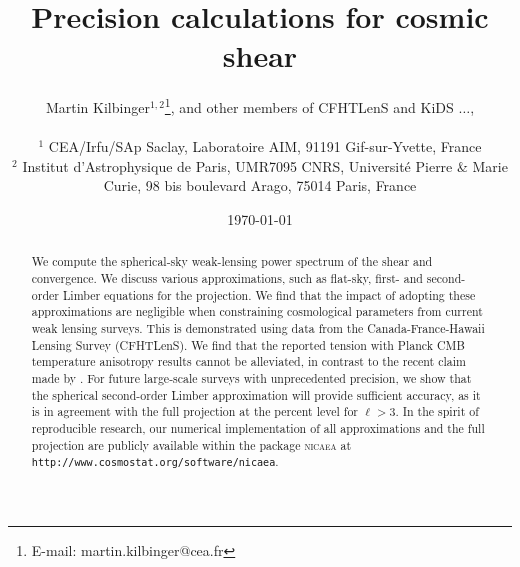 \documentclass[fleqn,usenatbib]{mnras} %
\begin{document}

\title[Precision calculations for cosmic shear]{Precision calculations for cosmic shear}  %

\author[M.~Kilbinger et~al.]
 {
  \parbox[h]{\textwidth}
  {
      Martin Kilbinger$^{1,2}$\thanks{E-mail: martin.kilbinger@cea.fr},
      and other members of CFHTLenS and KiDS
      $\ldots$,
  }
  \vspace*{10pt} \\
  \hspace{-.1cm}$^1$ CEA/Irfu/SAp Saclay, Laboratoire AIM, 91191 Gif-sur-Yvette, France\\
  \hspace{-.1cm}$^2$ Institut d'Astrophysique de Paris, UMR7095 CNRS,
           Universit\'e Pierre \& Marie Curie, 98 bis boulevard Arago, 75014 Paris,
           France \\
 }

\voffset-0.50in


\date{\today}

\pagerange{\pageref{firstpage}--\pageref{lastpage}} 

\maketitle

\label{firstpage}


\begin{abstract}

We compute the spherical-sky weak-lensing power spectrum of the shear and
convergence. We discuss various approximations, such as flat-sky, first- and
second-order Limber equations for the projection. We find that the impact of adopting 
these approximations are negligible when constraining cosmological parameters from 
current weak lensing surveys.
This is demonstrated using data from the Canada-France-Hawaii Lensing Survey (CFHTLenS). 
We find that the reported tension with Planck CMB temperature anisotropy results cannot be alleviated, in
contrast to the recent claim made by \citet{2016arXiv161104954K}. 
For future large-scale surveys with unprecedented precision, we show that the spherical
second-order Limber approximation will provide sufficient accuracy, as it is in 
agreement with the full projection at the percent level for $\ell > 3$.  
In the spirit of reproducible research, our numerical implementation of all approximations
and the full projection are publicly available within the package
\textsc{nicaea} at \texttt{http://www.cosmostat.org/software/nicaea}.

\end{abstract}
\end{document}
